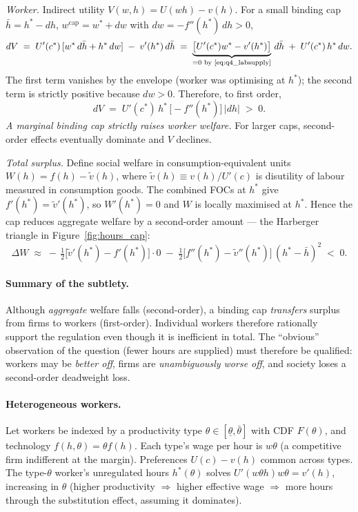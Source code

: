 \documentclass[11pt,a4paper]{article}
\begin{document}
\emph{Worker.} Indirect utility $V(w,h)=U(wh)-v(h)$. For a small binding cap $\bar h = h^{*}-dh$, $w^{\text{cap}}=w^{*}+dw$ with $dw = -f''(h^{*})\,dh>0$,
\[
dV\;=\;U'(c^{*})\,[w^{*}\,d\bar h + h^{*}\,dw]\;-\;v'(h^{*})\,d\bar h
\;=\;\underbrace{\bigl[U'(c^{*})w^{*}-v'(h^{*})\bigr]}_{=0\text{ by \eqref{eq:q4_labsupply}}}\,d\bar h\;+\;U'(c^{*})\,h^{*}\,dw.
\]
The first term vanishes by the envelope (worker was optimising at $h^{*}$); the second term is strictly positive because $dw>0$. Therefore, to first order,
\begin{equation}
dV\;=\;U'(c^{*})\,h^{*}\,\bigl[-f''(h^{*})\bigr]\,|dh|\;>\;0.
\label{eq:q4_dV}
\end{equation}
\emph{A marginal binding cap strictly raises worker welfare.} For larger caps, second-order effects eventually dominate and $V$ declines.

\emph{Total surplus.} Define social welfare in consumption-equivalent units $W(h)=f(h)-\tilde v(h)$, where $\tilde v(h)\equiv v(h)/U'(c)$ is disutility of labour measured in consumption goods. The combined FOCs at $h^{*}$ give $f'(h^{*})=\tilde v'(h^{*})$, so $W'(h^{*})=0$ and $W$ is locally maximised at $h^{*}$. Hence the cap reduces aggregate welfare by a second-order amount --- the Harberger triangle in Figure~\ref{fig:hours_cap}:
\begin{equation}
\Delta W\;\approx\;-\,\tfrac{1}{2}\bigl[\tilde v'(h^{*})-f'(h^{*})\bigr]\cdot 0\;-\;\tfrac{1}{2}\bigl[f''(h^{*})-\tilde v''(h^{*})\bigr]\,(h^{*}-\bar h)^{2}\;<\;0.
\label{eq:q4_dW}
\end{equation}

\paragraph{Summary of the subtlety.}
Although \emph{aggregate} welfare falls (second-order), a binding cap \emph{transfers} surplus from firms to workers (first-order). Individual workers therefore rationally support the regulation even though it is inefficient in total. The ``obvious'' observation of the question (fewer hours are supplied) must therefore be qualified: workers may be \emph{better off}, firms are \emph{unambiguously worse off}, and society loses a second-order deadweight loss.

\paragraph{Heterogeneous workers.}
Let workers be indexed by a productivity type $\theta\in[\underline\theta,\bar\theta]$ with CDF $F(\theta)$, and technology $f(h,\theta)=\theta f(h)$. Each type's wage per hour is $w\theta$ (a competitive firm indifferent at the margin). Preferences $U(c)-v(h)$ common across types. The type-$\theta$ worker's unregulated hours $h^{*}(\theta)$ solves $U'(w\theta h)w\theta=v'(h)$, increasing in $\theta$ (higher productivity $\Rightarrow$ higher effective wage $\Rightarrow$ more hours through the substitution effect, assuming it dominates).
\end{document}
